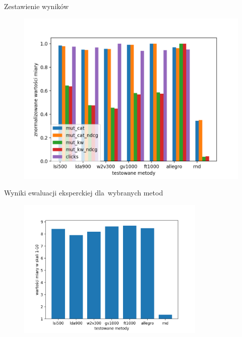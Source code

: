 \documentclass{beamer}
\begin{document}
	\begin{frame}{Zestawienie wyników}
		\begin{figure}[H]
			\centering
			\includegraphics[width=1\textwidth]{img/results/lsi500_lda900_w2v300_gv1000_ft1000_allegro_rnd_.png}
		\end{figure}
	\end{frame}
	\begin{frame}{Wyniki ewaluacji eksperckiej dla~wybranych metod}
		\begin{figure}[H]
			\centering
			\includegraphics[width=0.8\textwidth]{img/results/lsi500_lda900_w2v300_gv1000_ft1000_allegro_rnd_users.png}
		\end{figure}
	\end{frame}
\end{document}
